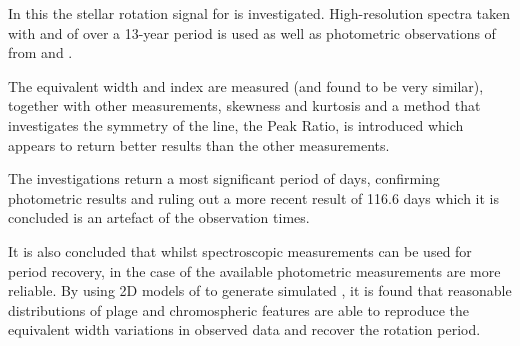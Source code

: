 In this {\paperorthesis} the stellar rotation signal for {\prox} is investigated. High-resolution spectra taken with
{\uves} and {\harps} of {\prox} over a 13-year period is used as well as photometric observations of {\prox} from
{\asas} and {\hst}.

The {\ha} equivalent width and {\ha} index are measured (and found to be very similar), together with other measurements,
  skewness and kurtosis and a method that investigates the symmetry of the line, the Peak Ratio, is introduced which
  appears to return better results than the other measurements.

The investigations return a most significant period of  days, confirming photometric
  results and ruling out a more recent result of 116.6 days which it is concluded is an artefact of the observation
  times.

It is also concluded that whilst spectroscopic {\ha} measurements can be used for period recovery, in the case of
   {\prox} the available photometric measurements are more reliable.  By using 2D models of {\prox} to generate
   simulated {\ha}, it is found that reasonable distributions of plage and chromospheric features are able to reproduce
   the equivalent width variations in observed data and recover the rotation period. 
